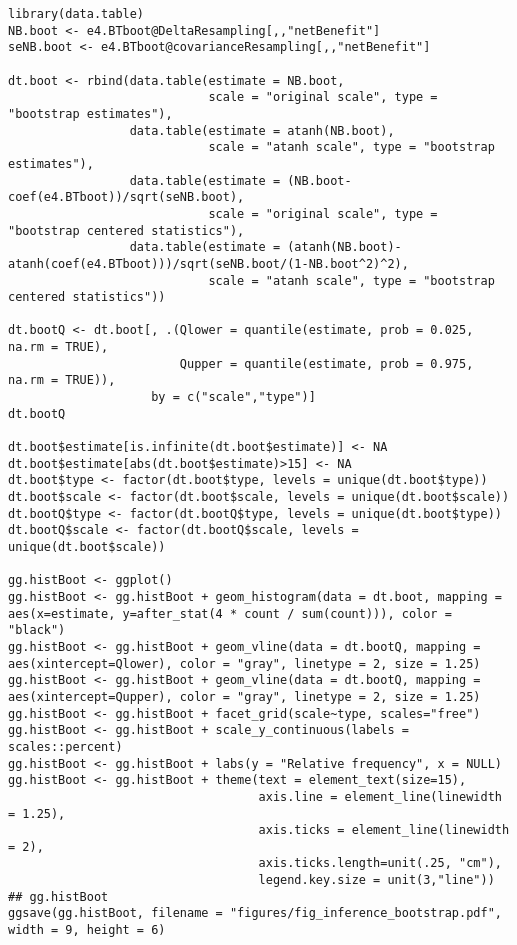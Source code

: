 \documentclass[12pt]{article}
\begin{document}
\lstset{language=r,label= ,caption= ,captionpos=b,numbers=none}
\begin{lstlisting}
library(data.table)
NB.boot <- e4.BTboot@DeltaResampling[,,"netBenefit"]
seNB.boot <- e4.BTboot@covarianceResampling[,,"netBenefit"]

dt.boot <- rbind(data.table(estimate = NB.boot,
                            scale = "original scale", type = "bootstrap estimates"),
                 data.table(estimate = atanh(NB.boot),
                            scale = "atanh scale", type = "bootstrap estimates"),
                 data.table(estimate = (NB.boot-coef(e4.BTboot))/sqrt(seNB.boot),
                            scale = "original scale", type = "bootstrap centered statistics"),
                 data.table(estimate = (atanh(NB.boot)-atanh(coef(e4.BTboot)))/sqrt(seNB.boot/(1-NB.boot^2)^2),
                            scale = "atanh scale", type = "bootstrap centered statistics"))

dt.bootQ <- dt.boot[, .(Qlower = quantile(estimate, prob = 0.025, na.rm = TRUE),
                        Qupper = quantile(estimate, prob = 0.975, na.rm = TRUE)),
                    by = c("scale","type")]
dt.bootQ

dt.boot$estimate[is.infinite(dt.boot$estimate)] <- NA
dt.boot$estimate[abs(dt.boot$estimate)>15] <- NA
dt.boot$type <- factor(dt.boot$type, levels = unique(dt.boot$type))
dt.boot$scale <- factor(dt.boot$scale, levels = unique(dt.boot$scale))
dt.bootQ$type <- factor(dt.bootQ$type, levels = unique(dt.boot$type))
dt.bootQ$scale <- factor(dt.bootQ$scale, levels = unique(dt.boot$scale))

gg.histBoot <- ggplot()
gg.histBoot <- gg.histBoot + geom_histogram(data = dt.boot, mapping = aes(x=estimate, y=after_stat(4 * count / sum(count))), color = "black")
gg.histBoot <- gg.histBoot + geom_vline(data = dt.bootQ, mapping = aes(xintercept=Qlower), color = "gray", linetype = 2, size = 1.25)
gg.histBoot <- gg.histBoot + geom_vline(data = dt.bootQ, mapping = aes(xintercept=Qupper), color = "gray", linetype = 2, size = 1.25)
gg.histBoot <- gg.histBoot + facet_grid(scale~type, scales="free")
gg.histBoot <- gg.histBoot + scale_y_continuous(labels = scales::percent)
gg.histBoot <- gg.histBoot + labs(y = "Relative frequency", x = NULL)
gg.histBoot <- gg.histBoot + theme(text = element_text(size=15), 
                                   axis.line = element_line(linewidth = 1.25),
                                   axis.ticks = element_line(linewidth = 2),
                                   axis.ticks.length=unit(.25, "cm"),
                                   legend.key.size = unit(3,"line"))
## gg.histBoot
ggsave(gg.histBoot, filename = "figures/fig_inference_bootstrap.pdf", width = 9, height = 6)
\end{lstlisting}
\end{document}
